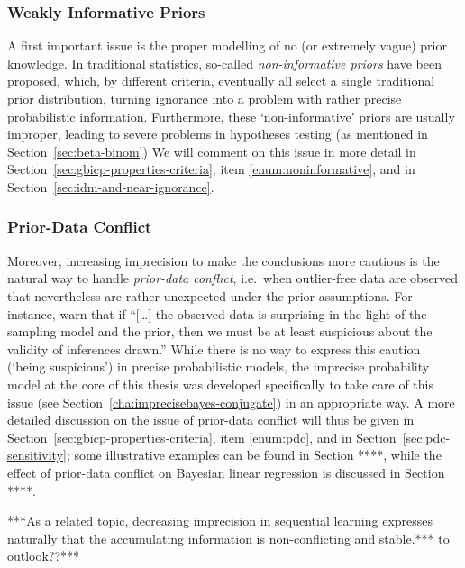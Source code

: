 \subsubsection{Weakly Informative Priors}
\label{sec:motivation:near-ignorance}

A first important issue is the proper modelling of no (or extremely vague) prior knowledge.
In traditional statistics, so-called \emph{non-informative priors} have been proposed, which, by different criteria,
eventually all select a single traditional prior distribution,
turning ignorance into a problem with rather precise probabilistic information.
Furthermore, these `non-informative' priors are usually improper,
leading to severe problems in hypotheses testing (as mentioned in Section~\ref{sec:beta-binom})
We will comment on this issue in more detail in Section~\ref{sec:gbicp-properties-criteria},
item \ref{enum:noninformative}, and in Section~\ref{sec:idm-and-near-ignorance}.

\subsubsection{Prior-Data Conflict}
\label{sec:motivation:pdc}

Moreover, increasing imprecision to make the conclusions more cautious
is the natural way to handle \emph{prior-data conflict},
i.e.\ when outlier-free data are observed that nevertheless are rather unexpected under the prior assumptions.
For instance, \textcite[p.~893]{2006:evans} warn that if
``[\ldots] the observed data is surprising in the light of the sampling model and the prior,
then we must be at least suspicious about the validity of inferences drawn.''
While there is no way to express this caution (`being suspicious') in precise probabilistic models,
the imprecise probability model at the core of this thesis was developed specifically to take care of this issue
(see Section~\ref{cha:imprecisebayes-conjugate}) in an appropriate way.
A more detailed discussion on the issue of prior-data conflict will thus be given in Section~\ref{sec:gbicp-properties-criteria},
item \ref{enum:pdc}, and in Section~\ref{sec:pdc-sensitivity};
some illustrative examples can be found in Section ****,
while the effect of prior-data conflict on Bayesian linear regression is discussed in Section ****.

***As a related topic, decreasing imprecision in sequential learning
expresses naturally that the accumulating information is non-conflicting and stable.*** to outlook??***





